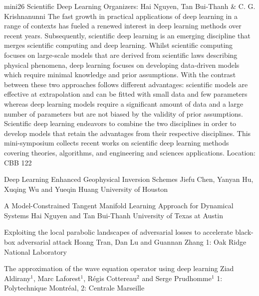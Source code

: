 \mini
{mini26}
{Scientific Deep Learning}
{Organizers: Hai Nguyen, Tan Bui-Thanh \& C. G. Krishnanunni}
{The fast growth in practical applications of deep learning in a range of contexts has fueled a renewed interest in deep learning methods over recent years. Subsequently, scientific deep learning is an emerging discipline that merges scientific computing and deep learning. Whilst scientific computing focuses on large-scale models that are derived from scientific laws describing physical phenomena, deep learning focuses on developing data-driven models which require minimal knowledge and prior assumptions. With the contrast between these two approaches follows different advantages: scientific models are effective at extrapolation and can be fitted with small data and few parameters whereas deep learning models require a significant amount of data and a large number of parameters but are not biased by the validity of prior assumptions. Scientific deep learning endeavors to combine the two disciplines in order to develop models that retain the advantages from their respective disciplines. This mini-symposium collects recent works on scientific deep learning methods covering theories, algorithms, and engineering and sciences applications.}
{Location: CBB 122}

\begin{talks}
\item\talk
{Deep Learning Enhanced Geophysical Inversion Schemes}
{Jiefu Chen, Yanyan Hu, Xuqing Wu and Yueqin Huang}
{University of Houston}
\item\talk
{A Model-Constrained Tangent Manifold Learning Approach for Dynamical Systems}
{Hai Nguyen and Tan Bui-Thanh}
{University of Texas at Austin}
\item\talk
{Exploiting the local parabolic landscapes of adversarial losses to accelerate black-box adversarial attack}
{Hoang Tran, Dan Lu and Guannan Zhang}
{1: Oak Ridge National Laboratory}
\item\talk
{The approximation of the wave equation operator using deep learning}
{Ziad Aldirany$^{1}$, Marc Laforest$^{1}$, Régis Cottereau$^2$ and Serge Prudhomme$^{1}$}
{1: Polytechnique Montréal, 2: Centrale Marseille}
\end{talks}
\room

